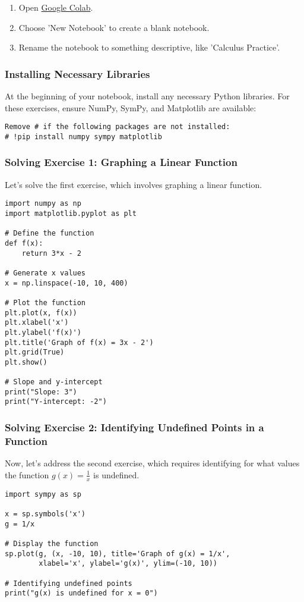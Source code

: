 \documentclass[a4paper,12pt]{book}
\begin{document}
\begin{enumerate}
    \item Open \href{https://colab.research.google.com/}{Google Colab}.
    \item Choose 'New Notebook' to create a blank notebook.
    \item Rename the notebook to something descriptive, like 'Calculus Practice'.
\end{enumerate}

\subsubsection*{Installing Necessary Libraries}
At the beginning of your notebook, install any necessary Python libraries. For these exercises, ensure NumPy, SymPy, and Matplotlib are available:

\begin{verbatim}
Remove # if the following packages are not installed:
# !pip install numpy sympy matplotlib
\end{verbatim}

\subsubsection*{Solving Exercise 1: Graphing a Linear Function}
Let's solve the first exercise, which involves graphing a linear function.

\begin{verbatim}
import numpy as np
import matplotlib.pyplot as plt

# Define the function
def f(x):
    return 3*x - 2

# Generate x values
x = np.linspace(-10, 10, 400)

# Plot the function
plt.plot(x, f(x))
plt.xlabel('x')
plt.ylabel('f(x)')
plt.title('Graph of f(x) = 3x - 2')
plt.grid(True)
plt.show()

# Slope and y-intercept
print("Slope: 3")
print("Y-intercept: -2")
\end{verbatim}

\subsubsection*{Solving Exercise 2: Identifying Undefined Points in a Function}
Now, let's address the second exercise, which requires identifying for what values the function \( g(x) = \frac{1}{x} \) is undefined.

\begin{verbatim}
import sympy as sp

x = sp.symbols('x')
g = 1/x

# Display the function
sp.plot(g, (x, -10, 10), title='Graph of g(x) = 1/x',
        xlabel='x', ylabel='g(x)', ylim=(-10, 10))

# Identifying undefined points
print("g(x) is undefined for x = 0")
\end{verbatim}
\end{document}

